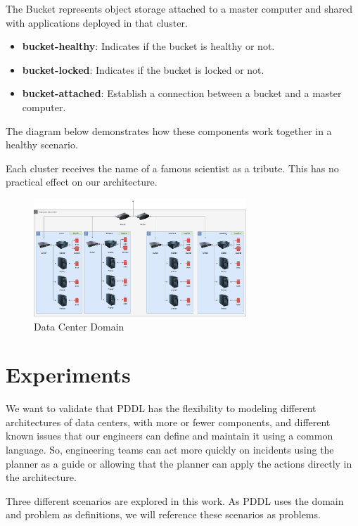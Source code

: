 \documentclass[letterpaper]{article}
\begin{document}
The Bucket represents object storage attached to a master computer and shared with applications deployed in that cluster.

\begin{itemize}
    \item \textbf{bucket-healthy}: Indicates if the bucket is healthy or not.
    \item \textbf{bucket-locked}: Indicates if the bucket is locked or not.
    \item \textbf{bucket-attached}: Establish a connection between a bucket and a master computer.
\end{itemize}

The diagram below demonstrates how these components work together in a healthy scenario.

Each cluster receives the name of a famous scientist as a tribute. This has no practical effect on our architecture.

\begin{figure}[ht]
    \centering
    \includegraphics[width=8cm]{images/diagrams-healthy.png}
    \caption{Data Center Domain}
    \label{fig:data-center-domain}
\end{figure}

\section{Experiments}\label{sec:experiments}

We want to validate that PDDL has the flexibility to modeling different architectures of data centers, with more or fewer components, and different known issues that our engineers can define and maintain it using a common language. So, engineering teams can act more quickly on incidents using the planner as a guide or allowing that the planner can apply the actions directly in the architecture.

Three different scenarios are explored in this work. As PDDL uses the domain and problem as definitions, we will reference these scenarios as problems.
\end{document}
